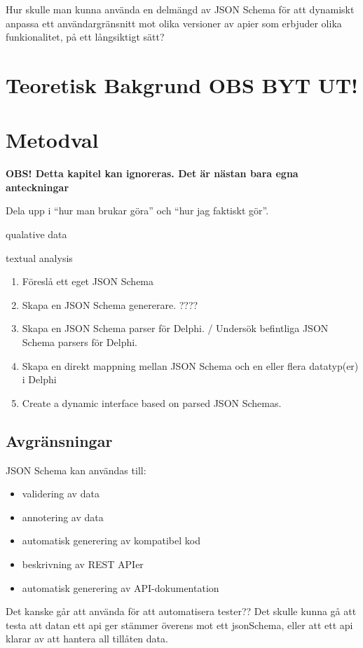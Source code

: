 \documentclass[swedish]{kththesis}
\begin{document}
Hur skulle man kunna använda en delmängd av JSON Schema för att dynamiskt anpassa ett användargränsnitt mot olika versioner av apier som erbjuder olika funkionalitet, på ett långsiktigt sätt?


\chapter{Teoretisk Bakgrund OBS BYT UT!}

\chapter{Metodval}

\textbf{OBS! Detta kapitel kan ignoreras. Det är nästan bara egna anteckningar}

Dela upp i \enquote{hur man brukar göra} och \enquote{hur jag faktiskt gör}.

qualative data

textual analysis

\begin{enumerate}
	\item Föreslå ett eget JSON Schema
	\item Skapa en JSON Schema genererare. ????
	\item Skapa en JSON Schema parser för Delphi. / Undersök befintliga JSON Schema parsers för Delphi.
	\item Skapa en direkt mappning mellan JSON Schema och en eller flera datatyp(er) i Delphi
	\item Create a dynamic interface based on parsed JSON Schemas.
\end{enumerate}

\section{Avgränsningar}

JSON Schema kan användas till:
\begin{itemize}
	\item validering av data
	\item annotering av data
	\item automatisk generering av kompatibel kod
	\item beskrivning av REST APIer
	\item automatisk generering av API-dokumentation
\end{itemize}

Det kanske går att använda för att automatisera tester?? Det skulle kunna gå att testa att datan ett api ger stämmer överens mot ett jsonSchema, eller att ett api klarar av att hantera all tillåten data.
\end{document}
